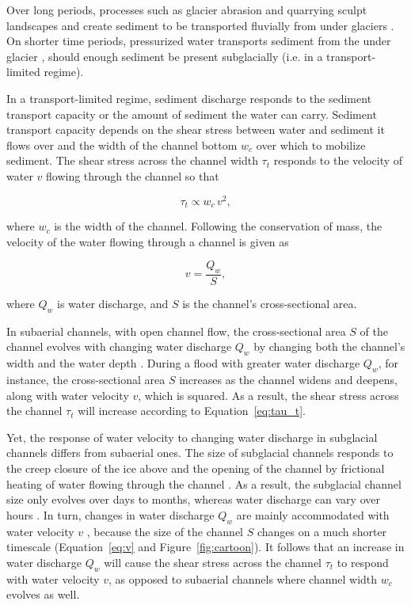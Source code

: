 \documentclass[11pt]{article}
\begin{document}
Over long periods, processes such as glacier abrasion and quarrying sculpt landscapes and create sediment to be transported fluvially from under glaciers \citep[c.f.][]{hallet1979,iverson2012,ugelvig2018}. 
On shorter time periods, pressurized water transports sediment from the under glacier \citep{walder1994,creyts2013,beaud2018}, should enough sediment be present subglacially (i.e. in a transport-limited regime).

In a transport-limited regime, sediment discharge responds to the sediment transport capacity or the amount of sediment the water can carry.
Sediment transport capacity depends on the shear stress between water and sediment it flows  over \citep{shields1936,meyer1948,engelund1967} and the width of the channel bottom $w_c$ over which to mobilize sediment.
The shear stress  across the channel width $\tau_t$ responds to the velocity of water $v$ flowing through the channel so that 
\begin{linenomath*}
  \begin{equation}
    \label{eq:tau_t}
    \tau_t \propto w_c\, v^2,
  \end{equation}
\end{linenomath*}
% 
where $w_c$ is the width of the channel.
Following the conservation of mass, the velocity of the water flowing through a  channel is given as 
\begin{linenomath*}
  \begin{equation}
    \label{eq:v}
    v = \frac{Q_w}{S},
  \end{equation}
\end{linenomath*}
% 
where $Q_w$ is water discharge,  and $S$ is the channel's cross-sectional area.

In subaerial channels, with open channel flow, the cross-sectional area $S$ of the channel evolves with changing water discharge $Q_w$  by changing both the channel's width and the water depth \citep{leopold1953}.
During a flood with greater water discharge $Q_w$, for instance, the cross-sectional area $S$ increases as the channel widens and deepens, along with water velocity $v$, which is squared. As a result, the shear stress across the channel $\tau_t$ will increase according to Equation~\ref{eq:tau_t}. 

Yet, the response of water velocity to changing water discharge in subglacial channels differs from subaerial ones.
The size of subglacial channels responds to the creep closure of the ice above and the opening of the channel by frictional heating of water flowing through the channel \citep{rothlisberger1972}.
As a result, the subglacial channel size only evolves over days to months, whereas water discharge can vary over hours \citep[e.g.][]{iken1986,andrews2014,nanni2020}.
In turn, changes in water discharge $Q_w$ are mainly accommodated with water velocity $v$ \citep[e.g.][]{swift2005}, because the size of the channel $S$ changes on a much shorter timescale (Equation~\ref{eq:v} and Figure~\ref{fig:cartoon}).
It follows that an increase in water discharge $Q_w$ will cause the shear stress across the channel $\tau_t$ to respond with water velocity $v$, as opposed to subaerial channels where channel width $w_c$ evolves as well. 
\end{document}
